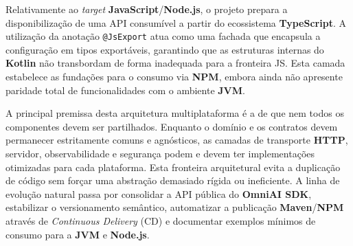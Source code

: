 Relativamente ao \textit{target} \textbf{JavaScript}/\textbf{Node.js}, o projeto prepara a disponibilização de uma API consumível a partir do ecossistema \textbf{TypeScript}. A utilização da anotação \texttt{@JsExport} atua como uma fachada que encapsula a configuração em tipos exportáveis, garantindo que as estruturas internas do \textbf{Kotlin} não transbordam de forma inadequada para a fronteira JS. Esta camada estabelece as fundações para o consumo via \textbf{NPM}, embora ainda não apresente paridade total de funcionalidades com o ambiente \textbf{JVM}.

A principal premissa desta arquitetura multiplataforma é a de que nem todos os componentes devem ser partilhados. Enquanto o domínio e os contratos devem permanecer estritamente comuns e agnósticos, as camadas de transporte \textbf{HTTP}, servidor, observabilidade e segurança podem e devem ter implementações otimizadas para cada plataforma. Esta fronteira arquitetural evita a duplicação de código sem forçar uma abstração demasiado rígida ou ineficiente. A linha de evolução natural passa por consolidar a API pública do \textbf{OmniAI SDK}, estabilizar o versionamento semântico, automatizar a publicação \textbf{Maven}/\textbf{NPM} através de \textit{Continuous Delivery} (CD) e documentar exemplos mínimos de consumo para a \textbf{JVM} e \textbf{Node.js}.
